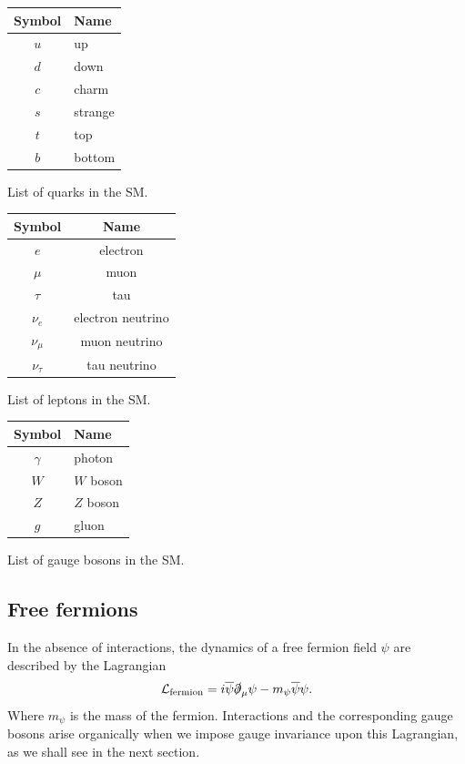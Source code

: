 \begin{margintable}[-15cm]
  \centering
  \begin{tabular}{c|l}
    Symbol & Name \\
  \hline
    $u$ & up\\
    $d$ & down \\
    $c$ & charm \\
    $s$ & strange \\
    $t$ & top \\
    $b$ & bottom \\
  \end{tabular}
  \caption{List of quarks in the SM.}
  \label{tab:quarks}
\end{margintable}

\begin{margintable}[-8cm]
  \centering
\begin{tabular}{c|c}
    Symbol & Name \\
  \hline
    $e$ & electron\\
    $\mu$ & muon \\
    $\tau$ & tau \\
    $\nu_e$ & electron neutrino \\
    $\nu_\mu$ & muon neutrino \\
    $\nu_\tau$ & tau neutrino \\
  \end{tabular}
  \caption{List of leptons in the SM.}
  \label{tab:leptons}
\end{margintable}

\begin{margintable}[-1cm]
  \centering
\begin{tabular}{c|l}
    Symbol & Name \\
  \hline
    $\gamma$ & photon\\
    $W$ & $W$ boson \\
    $Z$ & $Z$ boson \\
    $g$ & gluon \\
  \end{tabular}
  \caption{List of gauge bosons in the SM.}
  \label{tab:gaugebosons}
\end{margintable}

\subsection{Free fermions}
In the absence of interactions, the dynamics of a free fermion field $\psi$ are described by the Lagrangian
\begin{align}
  \mathcal{L}_\text{fermion} = i\overline{\psi}\slashed{\partial}_\mu\psi-m_{\psi}\overline{\psi}\psi.
\label{eq:fermion_lagrangian}
\end{align}
Where $m_\psi$ is the mass of the fermion. Interactions and the corresponding gauge bosons arise organically when we impose gauge invariance upon this Lagrangian, as we shall see in the next section.

